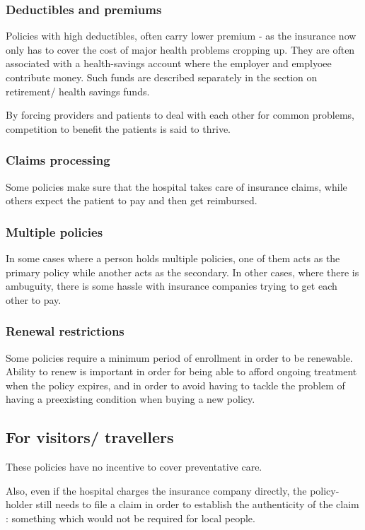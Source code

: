 \documentclass[oneside, article]{memoir}
\begin{document}
\subsubsection{Deductibles and premiums}
Policies with high deductibles, often carry lower premium - as the insurance now only has to cover the cost of major health problems cropping up. They are often associated with a health-savings account where the employer and emplyoee contribute money. Such funds are described separately in the section on retirement/ health savings funds. 

By forcing providers and patients to deal with each other for common problems, competition to benefit the patients is said to thrive.

\subsubsection{Claims processing}
Some policies make sure that the hospital takes care of insurance claims, while others expect the patient to pay and then get reimbursed.

\subsubsection{Multiple policies}
In some cases where a person holds multiple policies, one of them acts as the primary policy while another acts as the secondary. In other cases, where there is ambuguity, there is some hassle with insurance companies trying to get each other to pay.

\subsubsection{Renewal restrictions}
Some policies require a minimum period of enrollment in order to be renewable. Ability to renew is important in order for being able to afford ongoing treatment when the policy expires, and in order to avoid having to tackle the problem of having a preexisting condition when buying a new policy.

\subsection{For visitors/ travellers}
These policies have no incentive to cover preventative care.

Also, even if the hospital charges the insurance company directly, the policy-holder still needs to file a claim in order to establish the authenticity of the claim : something which would not be required for local people.
\end{document}
